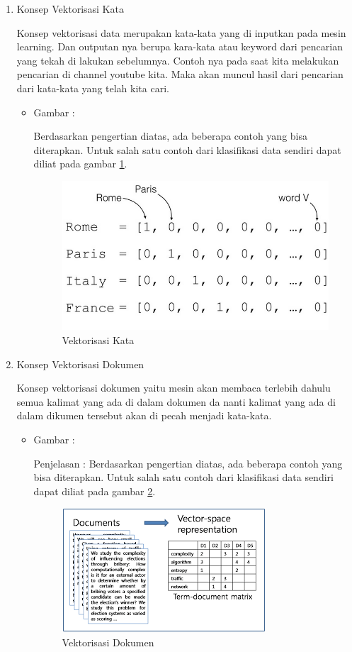 \begin{enumerate}
\item Konsep Vektorisasi Kata 
\par Konsep vektorisasi data merupakan kata-kata yang di inputkan pada mesin learning. Dan outputan nya berupa kara-kata atau keyword dari pencarian yang tekah di lakukan sebelumnya. Contoh nya pada saat kita melakukan pencarian di channel youtube kita. Maka akan muncul hasil dari pencarian dari kata-kata yang telah kita cari.
\par
\begin{itemize}
\item Gambar :
\par Berdasarkan pengertian diatas, ada beberapa contoh yang bisa diterapkan. Untuk salah satu contoh dari klasifikasi data sendiri dapat diliat pada gambar \ref{5_2}.
\begin{figure}[!hbtp]
\centering
\includegraphics[scale=0.3]{figures/zulfikar/5/5_1.png}
\caption{Vektorisasi Kata}
\label{5_2}
\end{figure}
\end{itemize}

\item Konsep Vektorisasi Dokumen 
\par Konsep vektorisasi dokumen yaitu mesin akan membaca terlebih dahulu semua kalimat yang ada di dalam dokumen da nanti kalimat yang ada di dalam dikumen tersebut akan di pecah menjadi kata-kata.
\par
\begin{itemize}
\item Gambar :
\par Penjelasan : Berdasarkan pengertian diatas, ada beberapa contoh yang bisa diterapkan. Untuk salah satu contoh dari klasifikasi data sendiri dapat diliat pada gambar \ref{5_3}.
\begin{figure}[!hbtp]
\centering
\includegraphics[scale=0.5]{figures/zulfikar/5/5_2.png}
\caption{Vektorisasi Dokumen}
\label{5_3}
\end{figure}
\end{itemize}


\end{enumerate}
